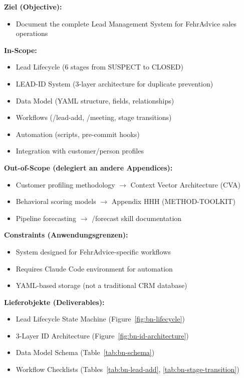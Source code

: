 \begin{tcolorbox}[
    colback=orange!5!white,
    colframe=orange!75!black,
    title={\textbf{Appendix Scope: Ziel / In-Scope / Out-of-Scope / Constraints}},
    fonttitle=\bfseries
]

\textbf{Ziel (Objective):}
\begin{itemize}[nosep]
    \item Document the complete Lead Management System for FehrAdvice sales operations
\end{itemize}

\textbf{In-Scope:}
\begin{itemize}[nosep]
    \item Lead Lifecycle (6 stages from SUSPECT to CLOSED)
    \item LEAD-ID System (3-layer architecture for duplicate prevention)
    \item Data Model (YAML structure, fields, relationships)
    \item Workflows (/lead-add, /meeting, stage transitions)
    \item Automation (scripts, pre-commit hooks)
    \item Integration with customer/person profiles
\end{itemize}

\textbf{Out-of-Scope (delegiert an andere Appendices):}
\begin{itemize}[nosep]
    \item Customer profiling methodology $\rightarrow$ Context Vector Architecture (CVA)
    \item Behavioral scoring models $\rightarrow$ Appendix HHH (METHOD-TOOLKIT)
    \item Pipeline forecasting $\rightarrow$ /forecast skill documentation
\end{itemize}

\textbf{Constraints (Anwendungsgrenzen):}
\begin{itemize}[nosep]
    \item System designed for FehrAdvice-specific workflows
    \item Requires Claude Code environment for automation
    \item YAML-based storage (not a traditional CRM database)
\end{itemize}

\textbf{Lieferobjekte (Deliverables):}
\begin{itemize}[nosep]
    \item Lead Lifecycle State Machine (Figure~\ref{fig:bn-lifecycle})
    \item 3-Layer ID Architecture (Figure~\ref{fig:bn-id-architecture})
    \item Data Model Schema (Table~\ref{tab:bn-schema})
    \item Workflow Checklists (Tables~\ref{tab:bn-lead-add}, \ref{tab:bn-stage-transition})
\end{itemize}

\end{tcolorbox}


